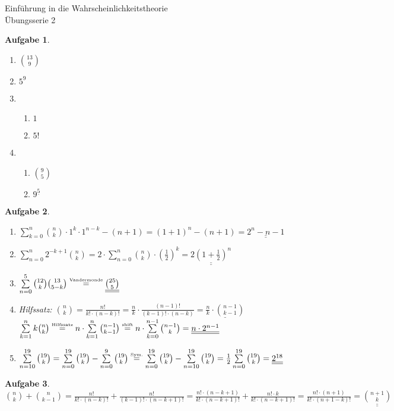 \documentclass[11pt]{article}
\theoremstyle{break}
\newtheorem{task}{Aufgabe}
\begin{document}
\begin{center}
\Large{Einführung in die Wahrscheinlichkeitstheorie}\\
\large{Übungsserie 2}
\end{center}
\setcounter{task}{2}
\begin{task}
\hfill\vspace{-5mm}
\begin{enumerate}
\item[(A)] $\binom{13}{9}$
\item[(U)] $5^9$
\item[(a)] \begin{enumerate}
\item[(A)] $1$
\item[(U)] $5!$
\end{enumerate}
\item[(b)]\begin{enumerate}
\item[(A)] $\binom{9}{5}$
\item[(U)] $9^{\underline{5}}$
\end{enumerate}
\end{enumerate}
\end{task}
\setcounter{task}{4}
\begin{task}
\hfill\vspace{-5mm}
\begin{enumerate}[label={(\alph*)}]
\item $\sum\limits_{k=0}^{n}\binom{n}{k}\cdot 1^k\cdot 1^{n-k}-(n+1)=(1+1)^n-(n+1)=\underline{\underline{2^n-n-1}}$
\item $\sum\limits_{n=0}^{n} 2^{-k+1}\binom{n}{k} = 2\cdot\sum\limits_{n=0}^{n} \binom{n}{k}\cdot \left(\frac{1}{2}\right)^{k} = \underline{\underline{2(1+\frac{1}{2})^n}}$
\item $\sum\limits_{n=0}^{5}\binom{12}{k}\binom{13}{5-k}\stackrel{\mbox{\tiny{Vandermonde}}}{=}\underline{\underline{\binom{25}{5}}}$
\item Hilfssatz: $\binom{n}{k}=\frac{n!}{k!\cdot(n-k)!}=\frac{n}{k}\cdot\frac{(n-1)!}{(k-1)!\cdot(n-k)}=\underline{\frac{n}{k}\cdot\binom{n-1}{k-1}}$\\
$\sum\limits_{k=1}^{n}k\binom{n}{k}\stackrel{\mbox{\tiny{Hilfssatz}}}{=}n\cdot\sum\limits_{k=1}^{n}\binom{n-1}{k-1}\stackrel{\mbox{\tiny{shift}}}{=}n\cdot\sum\limits_{k=0}^{n-1}\binom{n-1}{k}=\underline{\underline{n\cdot 2^{n-1}}}$
\item $\sum\limits_{n=10}^{19}\binom{19}{k}=\sum\limits_{n=0}^{19}\binom{19}{k}-\sum\limits_{n=0}^{9}\binom{19}{k}\stackrel{\mbox{\tiny{Sym.}}}{=}\sum\limits_{n=0}^{19}\binom{19}{k}-\sum\limits_{n=10}^{19}\binom{19}{k}=\frac{1}{2}\sum\limits_{n=0}^{19}\binom{19}{k}=\underline{\underline{2^{18}}}$
\end{enumerate}
\end{task}

\begin{task}
$\binom{n}{k}+\binom{n}{k-1}=\frac{n!}{k!\cdot(n-k)!}+\frac{n!}{(k-1)!\cdot(n-k+1)!}=
\frac{n!\cdot (n-k+1)}{k!\cdot(n-k+1)!}+\frac{n!\cdot k}{k!\cdot(n-k+1)!}=
\frac{n!\cdot (n+1)}{k!\cdot(n+1-k)!}=\underline{\underline{\binom{n+1}{k}}}$
\end{task}
\end{document}
